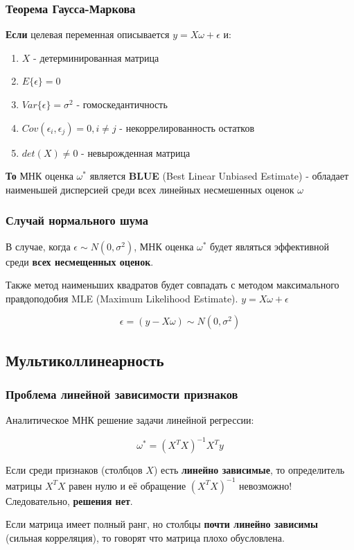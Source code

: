 \documentclass{beamer}
\begin{document}
	\begin{frame}
		\frametitle{Теорема Гаусса-Маркова}
		\textbf{Если} целевая переменная описывается $y = X\omega + \epsilon$ и:
		\begin{enumerate}
			\item $X$ - детерминированная матрица
			\item $E\{\epsilon\} = 0$
			\item $Var\{\epsilon\} = \sigma^2$ - гомоскедантичность
			\item $Cov(\epsilon_i, \epsilon_j) = 0, i \ne j$ - некоррелированность остатков
			\item $det(X) \ne 0$ - невырожденная матрица
		\end{enumerate}
		
		\vspace{5pt}
		
		\textbf{То} МНК оценка $\omega^{*}$ является \textbf{BLUE} (Best Linear Unbiased Estimate) - обладает наименьшей дисперсией среди всех линейных несмешенных оценок $\omega$
	\end{frame}		


	\begin{frame}
		\frametitle{Случай нормального шума}
		В случае, когда $\epsilon \sim N(0, \sigma^2)$, МНК оценка $\omega^{*}$ будет являться эффективной среди \textbf{всех несмещенных оценок}.
		
		\vspace{15pt}
		
		Также метод наименьших квадратов будет совпадать с методом максимального правдоподобия MLE (Maximum Likelihood Estimate).
		$y = X\omega + \epsilon$
		
		\[
		\epsilon = (y - X\omega) \sim N(0, \sigma^2)
		\]
	\end{frame}
	
	
	\subsection{Мультиколлинеарность}
	
	
	\begin{frame}
		\frametitle{Проблема линейной зависимости признаков}
		Аналитическое МНК решение задачи линейной регрессии:
		
		$$ \omega^{*} = (X^{T}X)^{-1} X^{T} y $$
		
		\vspace{5pt}
		
		Если среди признаков (столбцов $X$) есть \textbf{линейно зависимые}, то определитель матрицы $X^{T}X$ равен нулю и её обращение $(X^{T}X)^{-1}$ невозможно! Следовательно, \textbf{решения нет}.
		
		\vspace{15pt}
		Если матрица имеет полный ранг, но столбцы \textbf{почти линейно зависимы} (сильная корреляция), то говорят что матрица плохо обусловлена.
	\end{frame}
	
\end{document}
